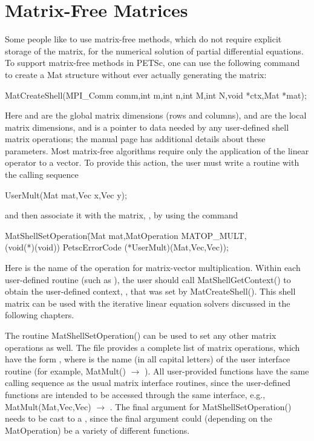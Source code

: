 \section{Matrix-Free Matrices} 
\label{sec_matrixfree}
Some people like to use matrix-free methods, which do not require
explicit storage of the matrix, for the numerical solution of partial
differential equations.  To support matrix-free methods in PETSc, one
can use the following command to create a Mat structure without
ever actually generating the matrix:
\begin{tabbing}
  MatCreateShell(MPI\_Comm comm,int m,int n,int M,int N,void *ctx,Mat *mat);
\end{tabbing}
Here  and  are the global matrix dimensions (rows and
columns),  and  are the local matrix dimensions, and
 is a pointer to data needed by any user-defined shell matrix
operations; the manual page has additional details about these
parameters.  Most matrix-free algorithms require only the application
of the linear operator to a vector. To provide this action, the user
must write a routine with the calling sequence
\begin{tabbing}
  UserMult(Mat mat,Vec x,Vec y);
\end{tabbing}
and then associate it with the matrix, , by using the
command
\begin{tabbing}
  MatShellSetOperation\=(Mat mat,MatOperation MATOP\_MULT,\\
                      \>         (void(*)(void)) PetscErrorCode (*UserMult)(Mat,Vec,Vec));
\end{tabbing}
Here  is the name of the operation for matrix-vector
multiplication. Within each user-defined routine (such as
), the user should call
MatShellGetContext() to obtain the user-defined context, ,
that was set by MatCreateShell().
This shell matrix can be used with the iterative linear
equation solvers discussed in the following chapters.

The routine MatShellSetOperation() can be used to set any other
matrix operations as well.  The file
 provides a complete list of matrix
operations, which have the form , where  is the name (in all capital letters) of the user
interface routine (for example, MatMult() $ \to $ ).  All
user-provided functions have the same calling sequence as the
usual matrix interface routines, since the user-defined functions are
intended to be accessed through the same interface, e.g.,
MatMult(Mat,Vec,Vec) $ \to$ .
The final argument for MatShellSetOperation() needs to be cast
to a , since the final argument could (depending on the
MatOperation) be a variety of different functions.

